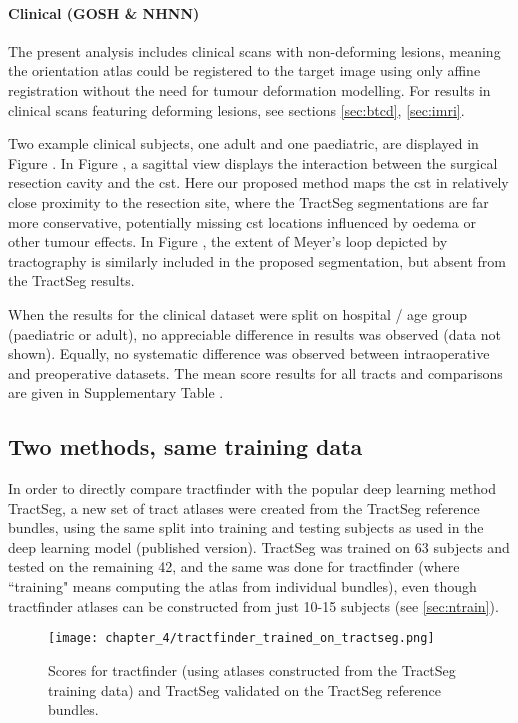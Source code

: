 \paragraph*{Clinical (GOSH \& NHNN)}

The present analysis includes clinical scans with non-deforming lesions, meaning the orientation atlas could be registered to the target image using only affine registration without the need for tumour deformation modelling.
For results in clinical scans featuring deforming lesions, see sections \ref{sec:btcd}, \ref{sec:imri}. %

Two example clinical subjects, one adult and one paediatric, are displayed in Figure .
In Figure , a sagittal view displays the interaction between the surgical resection cavity and the \gls{cst}.
Here our proposed method maps the \gls{cst} in relatively close proximity to the resection site, where the TractSeg segmentations are far more conservative, potentially missing \gls{cst} locations influenced by oedema or other tumour effects.
In Figure , the extent of Meyer's loop depicted by tractography is similarly included in the proposed segmentation, but absent from the TractSeg results.

When the results for the clinical dataset were split on hospital / age group (paediatric or adult), no appreciable difference in results was observed (data not shown).
Equally, no systematic difference was observed between intraoperative and preoperative datasets.
The mean score results for all tracts and comparisons are given in Supplementary Table .

\subsection{Two methods, same training data}

In order to directly compare tractfinder with the popular deep learning method TractSeg, a new set of tract atlases were created from the TractSeg reference bundles, using the same split into training and testing subjects as used in the deep learning model (published version).
TractSeg was trained on 63 subjects and tested on the remaining 42, and the same was done for tractfinder (where ``training" means computing the atlas from individual bundles), even though tractfinder atlases can be constructed from just 10-15 subjects (see \ref{sec:ntrain}).

\begin{figure}[htb!]
  \texttt{[image: chapter\_4/tractfinder\_trained\_on\_tractseg.png]}
  \caption{Scores for tractfinder (using atlases constructed from the TractSeg training data) and TractSeg validated on the TractSeg reference bundles.}
  \label{fig:ts_atlas}
\end{figure}

